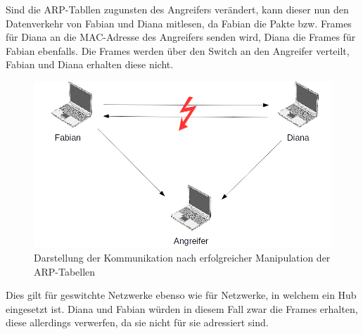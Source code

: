 Sind die ARP-Tabllen zugunsten des Angreifers verändert, kann dieser nun den Datenverkehr von Fabian und Diana mitlesen, da Fabian die Pakte bzw. Frames für Diana an die MAC-Adresse des Angreifers senden wird, Diana die Frames für Fabian ebenfalls. Die Frames werden über den Switch an den Angreifer verteilt, Fabian und Diana erhalten diese nicht.
\begin{figure}
	\centering
	\includegraphics[width=1\linewidth]{images/ARP-Tabelle-manipuliert.png}
	\caption{Darstellung der Kommunikation nach erfolgreicher Manipulation der ARP-Tabellen \cite{ARP-Tabelle-Bild-1}}
\end{figure}
Dies gilt für geswitchte Netzwerke ebenso wie für Netzwerke, in welchem ein Hub eingesetzt ist. Diana und Fabian würden in diesem Fall zwar die Frames erhalten, diese allerdings verwerfen, da sie nicht für sie adressiert sind.

